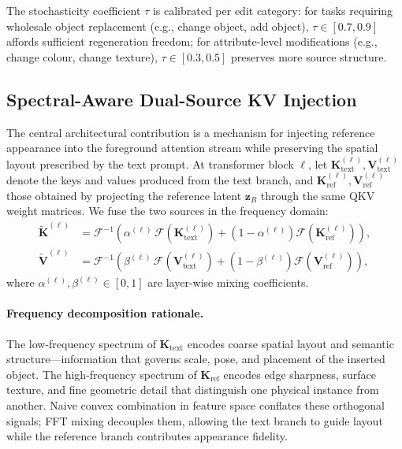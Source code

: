 The stochasticity coefficient $\tau$ is calibrated per edit category: for tasks requiring
wholesale object replacement (e.g., change object, add object),
$\tau \in [0.7, 0.9]$ affords sufficient regeneration freedom; for attribute-level
modifications (e.g., change colour, change texture),
$\tau \in [0.3, 0.5]$ preserves more source structure.

\subsection{Spectral-Aware Dual-Source KV Injection}

The central architectural contribution is a mechanism for injecting reference appearance into
the foreground attention stream while preserving the spatial layout prescribed by the text
prompt.
At transformer block $\ell$, let
$\mathbf{K}_{\text{text}}^{(\ell)}, \mathbf{V}_{\text{text}}^{(\ell)}$ denote the keys and
values produced from the text branch, and
$\mathbf{K}_{\text{ref}}^{(\ell)}, \mathbf{V}_{\text{ref}}^{(\ell)}$ those obtained by
projecting the reference latent $\mathbf{z}_B$ through the same QKV weight matrices.
We fuse the two sources in the frequency domain:
\begin{align}
    \tilde{\mathbf{K}}^{(\ell)}
        &= \mathcal{F}^{-1}\!\left(
              \alpha^{(\ell)}\,
              \mathcal{F}\!\left(\mathbf{K}_{\text{text}}^{(\ell)}\right)
            + \left(1 - \alpha^{(\ell)}\right)
              \mathcal{F}\!\left(\mathbf{K}_{\text{ref}}^{(\ell)}\right)
           \right),
    \label{eq:fg_K} \\
    \tilde{\mathbf{V}}^{(\ell)}
        &= \mathcal{F}^{-1}\!\left(
              \beta^{(\ell)}\,
              \mathcal{F}\!\left(\mathbf{V}_{\text{text}}^{(\ell)}\right)
            + \left(1 - \beta^{(\ell)}\right)
              \mathcal{F}\!\left(\mathbf{V}_{\text{ref}}^{(\ell)}\right)
           \right),
    \label{eq:fg_V}
\end{align}
where $\alpha^{(\ell)}, \beta^{(\ell)} \in [0,1]$ are layer-wise mixing coefficients.

\paragraph{Frequency decomposition rationale.}
The low-frequency spectrum of $\mathbf{K}_{\text{text}}$ encodes coarse spatial layout and
semantic structure---information that governs scale, pose, and placement of the inserted
object.
The high-frequency spectrum of $\mathbf{K}_{\text{ref}}$ encodes edge sharpness, surface
texture, and fine geometric detail that distinguish one physical instance from another.
Naive convex combination in feature space conflates these orthogonal signals; FFT mixing
decouples them, allowing the text branch to guide layout while the reference branch
contributes appearance fidelity.

